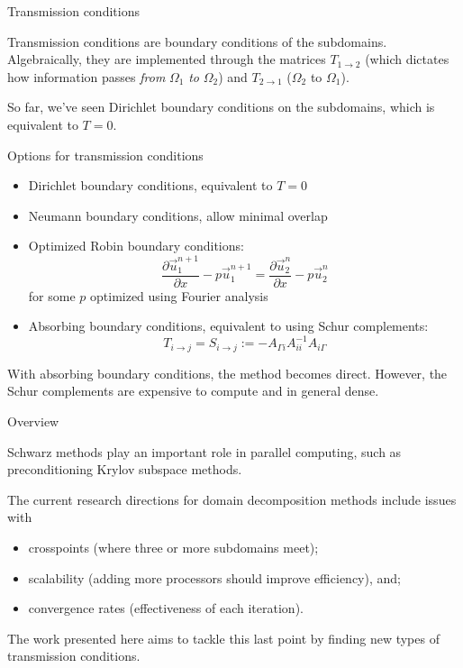 \documentclass{beamer}
\begin{document}
\begin{frame}{Transmission conditions}

Transmission conditions are boundary conditions of the subdomains.
Algebraically, they are implemented through the matrices $T_{1 \to 2}$ (which dictates how information passes \textit{from} $\Omega_1$ \textit{to} $\Omega_2$) and $T_{2 \to 1}$ ($\Omega_2$ to $\Omega_1$).

So far, we've seen Dirichlet boundary conditions on the subdomains, which is equivalent to $T=0$.

\end{frame}

\begin{frame}{Options for transmission conditions}

\begin{itemize}
\item Dirichlet boundary conditions, equivalent to $T=0$
\item Neumann boundary conditions, allow minimal overlap
\item Optimized Robin boundary conditions:
\begin{equation*}
	\frac{\partial \vec{u}_1^{n+1}}{\partial x} - p \vec{u}_1^{n+1} = \frac{\partial \vec{u}_2^{n}}{\partial x} - p \vec{u}_2^{n}
\end{equation*}
for some $p$ optimized using Fourier analysis
\item Absorbing boundary conditions, equivalent to using Schur complements:
\begin{equation*}
	T_{i \to j} = S_{i \to j} := -A_{\Gamma i} A_{ii}^{-1} A_{i \Gamma}
\end{equation*}
\end{itemize}
With absorbing boundary conditions, the method becomes direct.
However, the Schur complements are expensive to compute and in general dense.

\end{frame}

\begin{frame}{Overview}

Schwarz methods play an important role in parallel computing, such as preconditioning Krylov subspace methods.

The current research directions for domain decomposition methods include issues with 
\begin{itemize}
\item crosspoints (where three or more subdomains meet);
\item scalability (adding more processors should improve efficiency), and;
\item convergence rates (effectiveness of each iteration).
\end{itemize}

The work presented here aims to tackle this last point by finding new types of transmission conditions.
\end{frame}
\end{document}
